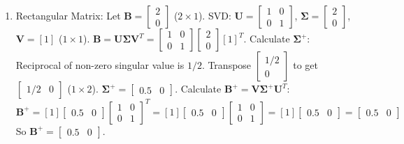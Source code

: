 \documentclass{article}
\newcommand{\mat}[1]{\bm{#1}}  %
\begin{document}
\begin{enumerate}
    \item Rectangular Matrix: Let $\mat{B} = \begin{bmatrix} 2 \\ 0 \end{bmatrix}$ ($2 \times 1$).
    SVD: $\mat{U} = \begin{bmatrix} 1 & 0 \\ 0 & 1 \end{bmatrix}$, $\mat{\Sigma} = \begin{bmatrix} 2 \\ 0 \end{bmatrix}$, $\mat{V} = [1]$ ($1 \times 1$).
    $\mat{B} = \mat{U}\mat{\Sigma}\mat{V}^T = \begin{bmatrix} 1 & 0 \\ 0 & 1 \end{bmatrix} \begin{bmatrix} 2 \\ 0 \end{bmatrix} [1]^T$.
    Calculate $\mat{\Sigma}^{+}$: Reciprocal of non-zero singular value is $1/2$. Transpose $\begin{bmatrix} 1/2 \\ 0 \end{bmatrix}$ to get $\begin{bmatrix} 1/2 & 0 \end{bmatrix}$ ($1 \times 2$). $\mat{\Sigma}^{+} = \begin{bmatrix} 0.5 & 0 \end{bmatrix}$.
    Calculate $\mat{B}^{+} = \mat{V} \mat{\Sigma}^{+} \mat{U}^T$:
    \[ \mat{B}^{+} = [1] \begin{bmatrix} 0.5 & 0 \end{bmatrix} \begin{bmatrix} 1 & 0 \\ 0 & 1 \end{bmatrix}^T = [1] \begin{bmatrix} 0.5 & 0 \end{bmatrix} \begin{bmatrix} 1 & 0 \\ 0 & 1 \end{bmatrix} = [1] \begin{bmatrix} 0.5 & 0 \end{bmatrix} = \begin{bmatrix} 0.5 & 0 \end{bmatrix} \]
    So $\mat{B}^{+} = \begin{bmatrix} 0.5 & 0 \end{bmatrix}$.
\end{enumerate}
\end{document}

